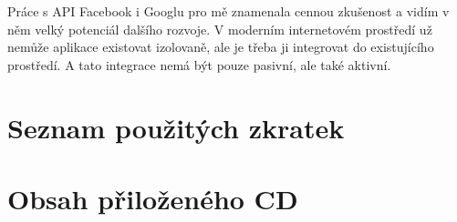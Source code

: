 \documentclass[thesis=B,czech]{FITthesis}[2012/06/26]
\begin{document}
\begin{conclusion}
Práce s API Facebook i Googlu pro mě znamenala cennou zkušenost a vidím v něm velký potenciál dalšího rozvoje. V moderním internetovém prostředí už nemůže aplikace existovat izolovaně, ale je třeba ji integrovat do existujícího prostředí. A tato integrace nemá být pouze pasivní, ale také aktivní.


    



  
%
%
%
%
%

\end{conclusion}




\appendix

\chapter{Seznam použitých zkratek}
\printglossaries


\chapter{Obsah přiloženého CD}


\begin{figure}
\end{figure}
\end{document}
